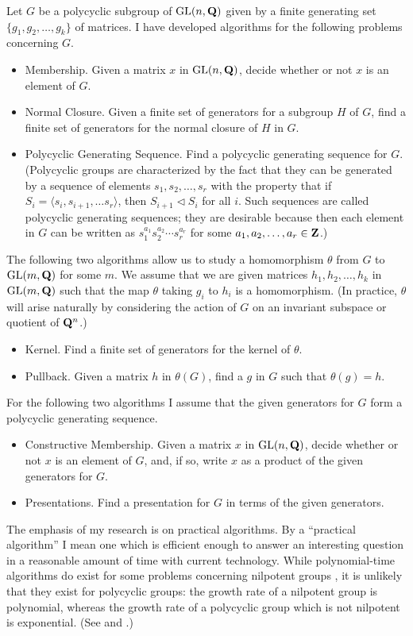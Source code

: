 Let $G$ be a polycyclic subgroup of 
$\mbox{GL} (n,{\bf Q})$ given by a finite generating set 
$ \{ g_1, g_2, \ldots, g_k \} $ of matrices.
I have developed algorithms for the following 
problems concerning $G$.  
\begin{itemize}
\item{Membership.} 
Given a matrix $x$ in $\mbox{GL} (n,{\bf Q})$,
decide whether or not $x$ is an element of $G$.
\item{Normal Closure.}
Given a finite set of generators for a subgroup $H$ of $G$,
find a finite set of generators for the normal closure of 
$H$ in $G$.
\item{Polycyclic Generating Sequence.}
Find a polycyclic generating sequence for $G$.
(Polycyclic groups are characterized by the fact 
that they can be generated by a sequence of 
elements $s_1,s_2,\ldots,s_r$ with the property
that if $S_i = \langle s_i, s_{i+1}, \ldots s_r \rangle$,
then $S_{i+1} \triangleleft S_{i}$ for all $i$.
Such sequences are called polycyclic generating
sequences; they are desirable because then each element
in $G$ can be written as $s_1^{a_1} s_2^{a_2} \cdots s_r^{a_r}$
for some $a_1, a_2, \ldots, a_r \in {\bf Z}$.)
\end{itemize}
The following two algorithms allow us to study 
a homomorphism $\theta$ from $G$ to $\mbox{GL} (m,{\bf Q})$ for some $m$.
We assume that we are given 
matrices $h_1,h_2,\ldots, h_k$ in $\mbox{GL} (m,{\bf Q})$
such that the map $\theta$ taking $g_i$ to $h_i$
is a homomorphism.
(In practice, $\theta$ will arise naturally by considering
the action of $G$ on an invariant subspace or quotient
of ${\bf Q}^{n}$.)
\begin{itemize}
\item{Kernel.}
Find a finite set of generators for the kernel of $\theta$.
\item{Pullback.}
Given a matrix $h$ in $\theta(G)$,
find a $g$ in $G$ such that $\theta(g) = h$.
\end{itemize}
For the following two algorithms I assume that 
the given generators for $G$ form a polycyclic
generating sequence.
\begin{itemize}
\item{Constructive Membership.}
Given a matrix $x$ in $\mbox{GL} (n,{\bf Q})$,
decide whether or not $x$ is an element of $G$,
and, if so, write $x$ as a product of the
given generators for $G$.
\item{Presentations.}
Find a presentation for $G$ in terms of the given generators.
\end{itemize}

The emphasis of my research is on practical algorithms.
By a ``practical algorithm'' I mean
one which is efficient enough to answer 
an interesting question in a reasonable amount of time
with current technology.
While polynomial-time algorithms do exist
for some problems concerning nilpotent groups
\cite{Beals:nilfin}, it is unlikely
that they exist for polycyclic groups:
the growth rate
of a nilpotent group is
polynomial, whereas the growth rate of a polycyclic
group which is not nilpotent is exponential.
(See \cite{Milnor} and \cite{Wolf}.)

